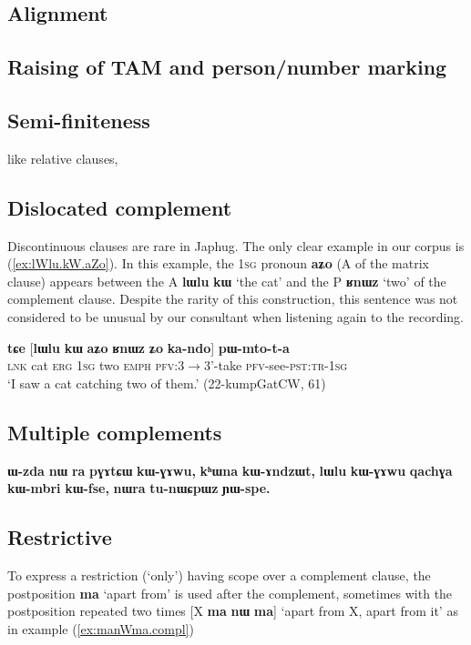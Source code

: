 \documentclass[oldfontcommands,oneside,a4paper,11pt]{article}
\newcommand{\ipa}[1]{\textbf{\phon#1}} %
\begin{document}
 \subsection{Alignment} 

  \subsection{Raising of TAM and person/number marking} 
  
  \subsection{Semi-finiteness} 
like relative clauses, \citealt{jacques16relatives}

 \subsection{Dislocated complement} 

Discontinuous clauses are rare in Japhug. The only clear example in our corpus is (\ref{ex:lWlu.kW.aZo}). In this example, the \textsc{1sg} pronoun \ipa{aʑo} (A of the matrix clause) appears between the A \ipa{lɯlu} 	\ipa{kɯ} `the cat' and the P \ipa{ʁnɯz} `two' of the complement clause. Despite the rarity of this construction, this sentence was not considered to be unusual by our consultant when listening again to the recording.
 
 \begin{exe}
\ex \label{ex:lWlu.kW.aZo}
\gll \ipa{tɕe} 	[\ipa{lɯlu} 	\ipa{kɯ} 	\ipa{aʑo} 	\ipa{ʁnɯz} 	\ipa{ʑo} 	\ipa{ka-ndo}] 	\ipa{pɯ-mto-t-a} \\
\textsc{lnk} cat \textsc{erg} \textsc{1sg} two \textsc{emph} \textsc{pfv}:3$\rightarrow$3'-take \textsc{pfv}-see-\textsc{pst:tr-1sg} \\
\glt `I saw a cat catching two of them.' (22-kumpGatCW, 61)
\end{exe}

  \subsection{Multiple complements}
 \ipa{ɯ-zda} 	\ipa{nɯ} 	\ipa{ra} 	\ipa{pɣɤtɕɯ} 	\ipa{kɯ-ɣɤwu,} 	\ipa{kʰɯna} 	\ipa{kɯ-ɤndzɯt,} 	\ipa{lɯlu} 	\ipa{kɯ-ɣɤwu} 	\ipa{qachɣa} 	\ipa{kɯ-mbri} 	\ipa{kɯ-fse,} 	\ipa{nɯra} 	\ipa{tu-nɯɕpɯz} 	\ipa{ɲɯ-spe.} 	
 
\subsection{Restrictive} 
To express a restriction (`only') having scope over a complement clause, the postposition \ipa{ma} `apart from' is used after the complement, sometimes with the postposition repeated two times [X \ipa{ma} \ipa{nɯ} \ipa{ma}] `apart from X, apart from it' as in example (\ref{ex:manWma.compl})
\end{document}
